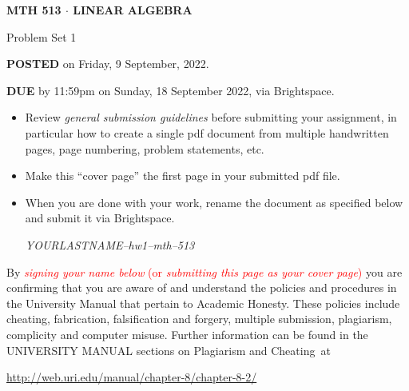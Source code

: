\documentclass[11pt,table]{article}
\newcommand{\<}			{\langle}
\renewcommand{\>}      		{\rangle}
\newcommand {\basicbox} 		{\begin{tcolorbox}[width=\textwidth,colback={black!1}]}
\newcommand {\overbox}      {\end{tcolorbox}}
\begin{document}
\thispagestyle{empty}

\begin{center}
	{\bf MTH 513  $\cdot$ LINEAR ALGEBRA}
	
	\medskip
	
	Problem Set 1
	
\end{center}

\basicbox
	
	\noindent
	{\bf POSTED} on Friday, 9 September, 2022. 
	
	\bigskip
	
	\noindent
	{\bf DUE} by 11:59pm on Sunday, 18 September 2022, via Brightspace.
	
	\bigskip
	



\begin{itemize}
	\item Review {\em general submission guidelines} before submitting your assignment, in particular how to create a single pdf document from multiple handwritten pages, page numbering, problem statements, etc. 
	
	\item Make this ``cover page'' the first page in your submitted pdf file. 
		
	\item When you are done with your work, rename the document as specified below and submit it via Brightspace. 
	
	\begin{center} 
		{\em YOURLASTNAME--hw1--mth--513} 
	\end{center} 
\end{itemize} 





\overbox


	\bigskip
	\bigskip
	
	\noindent 
	By \textcolor{red}{{\em signing your name below} (or {\em submitting this page as your cover page})}
	you are confirming that 
	you are aware of and understand
	the policies and procedures in the University Manual that pertain to Academic Honesty.
	These policies include cheating, fabrication, falsification and forgery, multiple submission,
	plagiarism, complicity and computer misuse. 
	Further information can be found in the UNIVERSITY MANUAL sections on Plagiarism and Cheating~at
	\begin{center}
		\url{http://web.uri.edu/manual/chapter-8/chapter-8-2/}
	\end{center}
\end{document}
